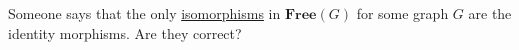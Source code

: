 Someone says that the only \href{doc/1 math/Seven Sketches in Compositionality/Chapter 3: Databases/2 Categories/5 Isomorphisms in a category/1 Isomorphism}{isomorphisms} in $\mathbf{Free}(G)$ for some graph $G$ are the identity morphisms. Are they correct?
